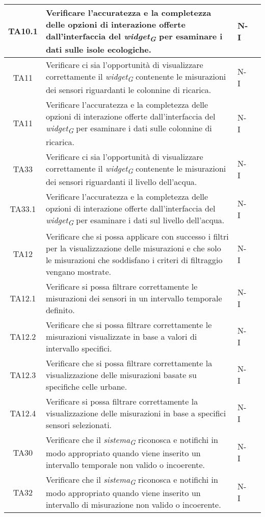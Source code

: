\begin{longtable}{|c|p{5cm}|p{2cm}|c|}
    \hline
    TA10.1 & Verificare l'accuratezza e la completezza delle opzioni di interazione offerte dall'interfaccia del \textit{widget}\textsubscript{\textit{G}} per esaminare i dati sulle isole ecologiche. & N-I \\
    \hline
    TA11 & Verificare ci sia l'opportunità di visualizzare correttamente il \textit{widget}\textsubscript{\textit{G}} contenente le misurazioni dei sensori riguardanti le colonnine di ricarica. & N-I \\
    \hline
    TA11 & Verificare l'accuratezza e la completezza delle opzioni di interazione offerte dall'interfaccia del \textit{widget}\textsubscript{\textit{G}} per esaminare i dati sulle colonnine di ricarica. & N-I \\
    \hline
    TA33 & Verificare ci sia l'opportunità di visualizzare correttamente il \textit{widget}\textsubscript{\textit{G}} contenente le misurazioni dei sensori riguardanti il livello dell'acqua. & N-I \\
    \hline
    TA33.1 & Verificare l'accuratezza e la completezza delle opzioni di interazione offerte dall'interfaccia del \textit{widget}\textsubscript{\textit{G}} per esaminare i dati sul livello dell'acqua. & N-I \\
    \hline
    TA12 & Verificare che si possa applicare con successo i filtri per la visualizzazione delle misurazioni e che solo le misurazioni che soddisfano i criteri di filtraggio vengano mostrate. & N-I \\
    \hline
    TA12.1 & Verificare si possa filtrare correttamente le misurazioni dei sensori in un intervallo temporale definito. & N-I \\
    \hline
    TA12.2 & Verificare che si possa filtrare correttamente le misurazioni visualizzate in base a valori di intervallo specifici. & N-I \\
    \hline
    TA12.3 & Verificare che si possa filtrare correttamente la visualizzazione delle misurazioni basate su specifiche celle urbane. & N-I \\
    \hline
    TA12.4 & Verificare si possa filtrare correttamente la visualizzazione delle misurazioni in base a specifici sensori selezionati. & N-I \\
    \hline
    TA30 & Verificare che il \textit{sistema}\textsubscript{\textit{G}} riconosca e notifichi in modo appropriato quando viene inserito un intervallo temporale non valido o incoerente. & N-I \\
    \hline
    TA32 & Verificare che il \textit{sistema}\textsubscript{\textit{G}} riconosca e notifichi in modo appropriato quando viene inserito un intervallo di misurazione non valido o incoerente. & N-I \\

\end{longtable}
